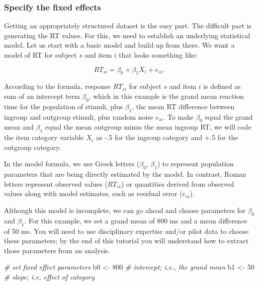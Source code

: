 \documentclass[
  english,
  doc,floatsintext]{apa6}
\newenvironment{Shaded}{\begin{snugshade}}{\end{snugshade}}
\newcommand{\CommentTok}[1]{\textcolor[rgb]{0.56,0.35,0.01}{\textit{#1}}}
\newcommand{\DecValTok}[1]{\textcolor[rgb]{0.00,0.00,0.81}{#1}}
\newcommand{\NormalTok}[1]{#1}
\newcommand{\StringTok}[1]{\textcolor[rgb]{0.31,0.60,0.02}{#1}}
\begin{document}
\hypertarget{specify-the-fixed-effects}{%
\subsubsection{Specify the fixed effects}\label{specify-the-fixed-effects}}

Getting an appropriately structured dataset is the easy part. The difficult part is generating the RT values. For this, we need to establish an underlying statistical model. Let us start with a basic model and build up from there. We want a model of RT for subject \(s\) and item \(i\) that looks something like:

\begin{equation}
RT_{si} = \beta_0 + \beta_1 X_{i} + e_{si}.
\end{equation}

\noindent According to the formula, response \(RT_{si}\) for subject \(s\) and item \(i\) is defined as sum of an intercept term \(\beta_0\), which in this example is the grand mean reaction time for the population of stimuli, plus \(\beta_1\), the mean RT difference between ingroup and outgroup stimuli, plus random noise \(e_{si}\). To make \(\beta_0\) equal the grand mean and \(\beta_1\) equal the mean outgroup minus the mean ingroup RT, we will code the item category variable \(X_{i}\) as -.5 for the ingroup category and +.5 for the outgroup category.

In the model formula, we use Greek letters (\(\beta_0\), \(\beta_1\)) to represent population parameters that are being directly estimated by the model. In contrast, Roman letters represent observed values (\(RT_{si}\)) or quantities derived from observed values along with model estimates, such as residual error (\(e_{si}\)).

Although this model is incomplete, we can go ahead and choose parameters for \(\beta_0\) and \(\beta_1\). For this example, we set a grand mean of 800 ms and a mean difference of 50 ms. You will need to use disciplinary expertise and/or pilot data to choose these parameters; by the end of this tutorial you will understand how to extract those parameters from an analysis.

\begin{Shaded}
\begin{Highlighting}[]
\CommentTok{# set fixed effect parameters}
\NormalTok{b0 <-}\StringTok{ }\DecValTok{800} \CommentTok{# intercept; i.e., the grand mean}
\NormalTok{b1 <-}\StringTok{  }\DecValTok{50} \CommentTok{# slope; i.e, effect of category}
\end{Highlighting}
\end{Shaded}
\end{document}

